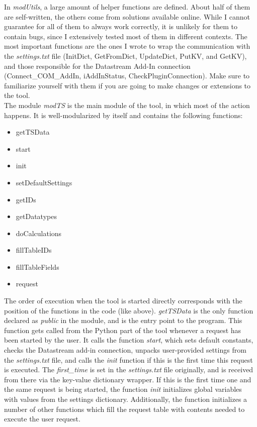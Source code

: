 In \textit{modUtils}, a large amount of helper functions are defined. About half of them are self-written, the others come from solutions available online. While I cannot guarantee for all of them to always work correctly, it is unlikely for them to contain bugs, since I extensively tested most of them in different contexts. 
The most important functions are the ones I wrote to wrap the communication with the \textit{settings.txt} file (InitDict, GetFromDict, UpdateDict, PutKV, and GetKV), and those responsible for the Datastream Add-In connection (Connect\_COM\_AddIn, iAddInStatus, CheckPluginConnection). Make sure to familiarize yourself with them if you are going to make changes or extensions to the tool. \\

The module \textit{modTS} is the main module of the tool, in which most of the action happens. It is well-modularized by itself and contains the following functions: 
\begin{itemize}
	\item getTSData
	\item start
	\item init
	\item setDefaultSettings
	\item getIDs
	\item getDatatypes
	\item doCalculations
	\item fillTableIDs
	\item fillTableFields
	\item request
\end{itemize}
The order of execution when the tool is started directly corresponds with the position of the functions in the code (like above). \textit{getTSData} is the only function declared as \textit{public} in the module, and is the entry point to the program. This function gets called from the Python part of the tool whenever a request has been started by the user. It calls the function \textit{start}, which sets default constants, checks the Datastream add-in connection, unpacks user-provided settings from the \textit{settings.txt} file, and calls the \textit{init} function if this is the first time this request is executed. The \textit{first\_time} is set in the \textit{settings.txt} file originally, and is received from there via the key-value dictionary wrapper. If this is the first time one and the same request is being started, the function \textit{init} initializes global variables with values from the settings dictionary. Additionally, the function initializes a number of other functions which fill the request table with contents needed to execute the user request. \\

